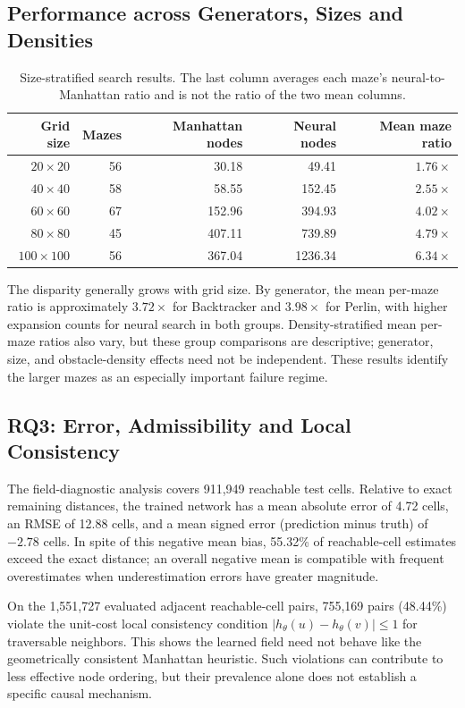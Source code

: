 \subsection{Performance across Generators, Sizes and Densities}
\label{sec:d3-strata}
\begin{table}[H]
\centering
\small
\begin{tabular}{rrrrr}
\toprule
Grid size & Mazes & Manhattan nodes & Neural nodes & Mean maze ratio \\
\midrule
$20\times20$ & 56 & 30.18 & 49.41 & $1.76\times$ \\
$40\times40$ & 58 & 58.55 & 152.45 & $2.55\times$ \\
$60\times60$ & 67 & 152.96 & 394.93 & $4.02\times$ \\
$80\times80$ & 45 & 407.11 & 739.89 & $4.79\times$ \\
$100\times100$ & 56 & 367.04 & 1236.34 & $6.34\times$ \\
\bottomrule
\end{tabular}
\caption{Size-stratified search results. The last column averages each maze's
neural-to-Manhattan ratio and is not the ratio of the two mean columns.}
\label{tab:d3-size}
\end{table}

The disparity generally grows with grid size. By generator, the mean per-maze
ratio is approximately $3.72\times$ for Backtracker and $3.98\times$ for
Perlin, with higher expansion counts for neural search in both groups.
Density-stratified mean per-maze ratios also vary, but these group
comparisons are descriptive; generator, size, and obstacle-density effects
need not be independent. These results identify the larger mazes as an
especially important failure regime.

\subsection{RQ3: Error, Admissibility and Local Consistency}
\label{sec:d3-field}
The field-diagnostic analysis covers 911,949 reachable test cells. Relative
to exact remaining distances, the trained network has a mean absolute error
of 4.72 cells, an RMSE of 12.88 cells, and a mean signed error
(prediction minus truth) of $-2.78$ cells. In spite of this negative mean bias,
55.32\% of reachable-cell estimates exceed the exact distance; an overall
negative mean is compatible with frequent overestimates when underestimation
errors have greater magnitude.

On the 1,551,727 evaluated adjacent reachable-cell pairs, 755,169 pairs
(48.44\%) violate the unit-cost local consistency condition
$|h_\theta(u)-h_\theta(v)|\leq1$ for traversable neighbors. This shows the
learned field need not behave like the geometrically consistent Manhattan
heuristic. Such violations can contribute to less effective node ordering,
but their prevalence alone does not establish a specific causal mechanism.


